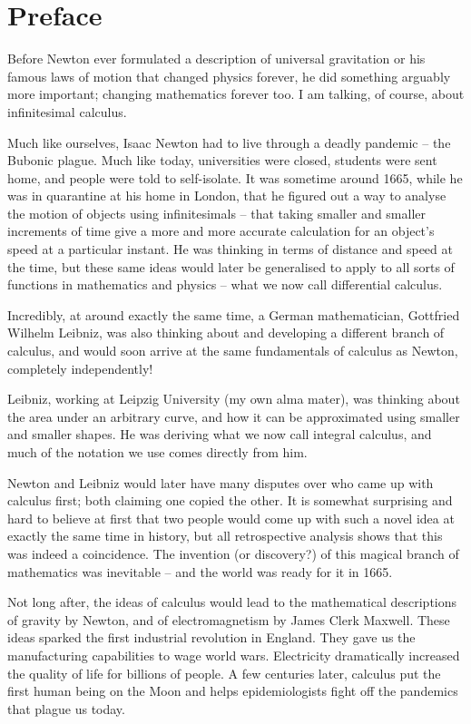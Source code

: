\documentclass[../main.tex]{subfiles}
\begin{document}
\chapter{Preface}
Before Newton ever formulated a description of universal gravitation 
or his famous laws of motion that changed physics forever, 
he did something arguably more important; changing mathematics forever too. 
I am talking, of course, about infinitesimal calculus.

Much like ourselves, Isaac Newton had to live through a deadly pandemic – 
the Bubonic plague. Much like today, universities were closed, 
students were sent home, and people were told to self-isolate. 
It was sometime around 1665, 
while he was in quarantine at his home in London, that he 
figured out a way to analyse the motion of objects using infinitesimals – 
that taking smaller and smaller increments of time give a more and more 
accurate calculation for an object’s speed at a particular instant. 
He was thinking in terms of distance and speed at the time, 
but these same ideas would later be generalised to apply to all sorts of 
functions in mathematics and physics – what we now call 
differential calculus.

Incredibly, at around exactly the same time, a German mathematician, 
Gottfried Wilhelm Leibniz, was also thinking about and developing 
a different branch of calculus, and would soon arrive at the same 
fundamentals of calculus as Newton, completely independently!

Leibniz, working at Leipzig University (my own alma mater), 
was thinking about the area under an arbitrary curve, 
and how it can be approximated using smaller and smaller shapes. 
He was deriving what we now call integral calculus, 
and much of the notation we use comes directly from him.

Newton and Leibniz would later have many disputes 
over who came up with calculus first; both claiming one copied the other. 
It is somewhat surprising and hard to believe at first that 
two people would come up with such a novel idea at exactly the same time 
in history, but all retrospective analysis shows that this was indeed a 
coincidence. The invention (or discovery?) of this magical branch 
of mathematics was inevitable – and the world was ready for it in 1665.

Not long after, the ideas of calculus would lead to 
the mathematical descriptions of gravity by Newton, 
and of electromagnetism by James Clerk Maxwell. 
These ideas sparked the first industrial revolution in England. 
They gave us the manufacturing capabilities to wage world wars. 
Electricity dramatically increased the quality of life for 
billions of people. A few centuries later, 
calculus put the first human being on the Moon and 
helps epidemiologists fight off the pandemics that plague us today.
\end{document}
